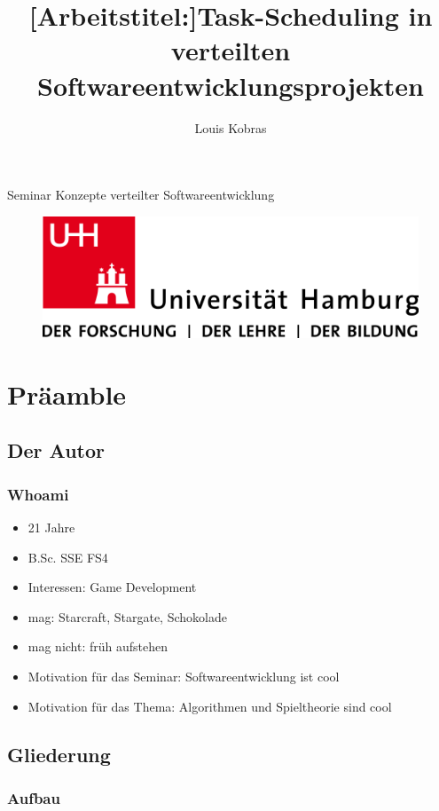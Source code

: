 \documentclass[%
]{beamer}
\author{Louis Kobras}
\title{[Arbeitstitel:]Task-Scheduling in verteilten Softwareentwicklungsprojekten}
\begin{document}
\begin{frame}
	\maketitle
	\vspace{-0.2cm}
	\begin{center}
		Seminar Konzepte verteilter Softwareentwicklung
		\begin{figure}[h]
			\includegraphics[scale=.2]{img/uhh-logo}
		\end{figure}
	\end{center}
\end{frame}

\section{Präamble}
	\subsection{Der Autor}
		\begin{frame}
			\frametitle{Whoami}
			\begin{itemize}
				\item 21 Jahre
				\item B.Sc. SSE FS4
				\item Interessen: Game Development\pause
				\item mag: Starcraft, Stargate, Schokolade
				\item mag nicht: früh aufstehen\pause
				\item Motivation für das Seminar: Softwareentwicklung ist cool
				\item Motivation für das Thema: Algorithmen und Spieltheorie sind cool
			\end{itemize}
		\end{frame}
	\subsection{Gliederung}
		\begin{frame}
			\frametitle{Aufbau}
			\tableofcontents
		\end{frame}
\end{document}
